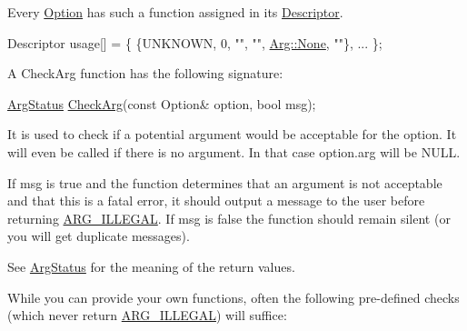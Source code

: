 Every \hyperlink{classoption_1_1_option}{Option} has such a function assigned in its \hyperlink{structoption_1_1_descriptor}{Descriptor}. 
\begin{DoxyCode}
Descriptor usage[] = \{ \{UNKNOWN, 0, \textcolor{stringliteral}{""}, \textcolor{stringliteral}{""}, \hyperlink{structoption_1_1_arg_a7fc01987899c91c6b6a1be5711a46e22}{Arg::None}, \textcolor{stringliteral}{""}\}, ... \};
\end{DoxyCode}


A Check\+Arg function has the following signature\+: 
\begin{DoxyCode}
\hyperlink{namespaceoption_aee8c76a07877335762631491e7a5a1a9}{ArgStatus} \hyperlink{namespaceoption_a4cdf403efae65e18bf850e2001b12a2a}{CheckArg}(\textcolor{keyword}{const} Option& option, \textcolor{keywordtype}{bool} msg); 
\end{DoxyCode}


It is used to check if a potential argument would be acceptable for the option. It will even be called if there is no argument. In that case {\ttfamily option.\+arg} will be {\ttfamily N\+U\+LL}.

If {\ttfamily msg} is {\ttfamily true} and the function determines that an argument is not acceptable and that this is a fatal error, it should output a message to the user before returning \hyperlink{namespaceoption_aee8c76a07877335762631491e7a5a1a9a9528e32563b795bd2930b12d0a5e382d}{A\+R\+G\+\_\+\+I\+L\+L\+E\+G\+AL}. If {\ttfamily msg} is {\ttfamily false} the function should remain silent (or you will get duplicate messages).

See \hyperlink{namespaceoption_aee8c76a07877335762631491e7a5a1a9}{Arg\+Status} for the meaning of the return values.

While you can provide your own functions, often the following pre-\/defined checks (which never return \hyperlink{namespaceoption_aee8c76a07877335762631491e7a5a1a9a9528e32563b795bd2930b12d0a5e382d}{A\+R\+G\+\_\+\+I\+L\+L\+E\+G\+AL}) will suffice\+:


